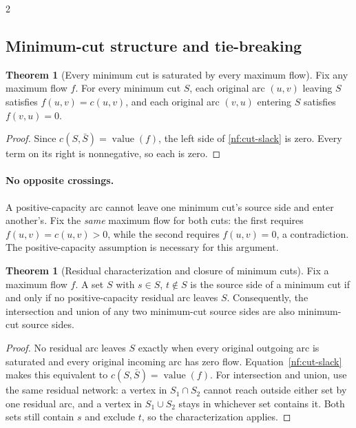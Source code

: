 \documentclass[8pt]{extarticle}
\theoremstyle{definition}
\newtheorem{theorem}[definition]{Theorem}
\begin{document}
\begin{multicols*}{2}
\subsection{Minimum-cut structure and tie-breaking}\label{nf:cut-structure}
\begin{theorem}[Every minimum cut is saturated by every maximum flow]
Fix any maximum flow $f$. For every minimum cut $S$, each original arc
$(u,v)$ leaving $S$ satisfies $f(u,v)=c(u,v)$, and each original arc
$(v,u)$ entering $S$ satisfies $f(v,u)=0$.
\end{theorem}
\begin{proof}
Since $c(S,\bar S)=\operatorname{value}(f)$, the left side of \eqref{nf:cut-slack} is zero.
Every term on its right is nonnegative, so each is zero.
\end{proof}
\paragraph{No opposite crossings.}
A positive-capacity arc cannot leave one minimum cut's source side and enter
another's. Fix the \emph{same} maximum flow for both cuts: the first requires
$f(u,v)=c(u,v)>0$, while the second requires $f(u,v)=0$, a contradiction.
The positive-capacity assumption is necessary for this argument.

\begin{theorem}[Residual characterization and closure of minimum cuts]\label{nf:cut-lattice}
Fix a maximum flow $f$. A set $S$ with $s\in S$, $t\notin S$ is the
source side of a minimum cut if and only if no positive-capacity residual
arc leaves $S$. Consequently, the intersection and union of any two
minimum-cut source sides are also minimum-cut source sides.
\end{theorem}
\begin{proof}
No residual arc leaves $S$ exactly when every original outgoing arc is
saturated and every original incoming arc has zero flow.
Equation~\eqref{nf:cut-slack} makes this equivalent to $c(S,\bar S)=\operatorname{value}(f)$.
For intersection and union, use the same residual network: a vertex in
$S_1\cap S_2$ cannot reach outside either set by one residual arc, and a
vertex in $S_1\cup S_2$ stays in whichever set contains it. Both sets
still contain $s$ and exclude $t$, so the characterization applies.
\end{proof}


\end{multicols*}
\end{document}
